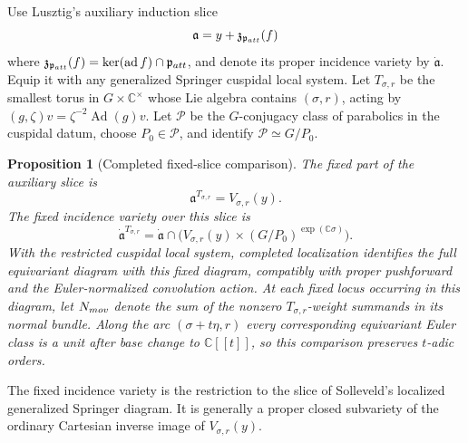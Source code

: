 \documentclass[10pt,a4paper]{amsart}
\newtheorem{proposition}[theorem]{Proposition}
\begin{document}
Use Lusztig's auxiliary induction slice
\[
 \mathfrak a=y+\mathfrak z_{\mathfrak p_{\rm att}}(f)
\]
where
$\mathfrak z_{\mathfrak p_{\rm att}}(f)=
\ker(\operatorname{ad}f)\cap\mathfrak p_{\rm att}$, and denote its proper
incidence variety by $\dot{\mathfrak a}$.  Equip it
with any generalized Springer cuspidal local system.  Let $T_{\sigma,r}$ be
the smallest torus in $G\times\mathbb C^\times$
whose Lie algebra contains $(\sigma,r)$, acting by
$(g,\zeta)v=\zeta^{-2}\operatorname{Ad}(g)v$.
Let $\mathcal P$ be the $G$-conjugacy class of parabolics in the cuspidal
datum, choose $P_0\in\mathcal P$, and identify $\mathcal P\simeq G/P_0$.

\begin{proposition}[Completed fixed-slice comparison]
\label{prop:general-fixed-slice}
The fixed part of the auxiliary slice is
\begin{equation}\label{eq:general-fixed-slice}
 \mathfrak a^{T_{\sigma,r}}=V_{\sigma,r}(y).
\end{equation}
The fixed incidence
variety over this slice is
\[
 \dot{\mathfrak a}^{T_{\sigma,r}}
 =\dot{\mathfrak a}\cap
 \bigl(V_{\sigma,r}(y)\times(G/P_0)^{\exp(\mathbb C\sigma)}\bigr).
\]
With the restricted cuspidal local system, completed localization identifies
the full equivariant diagram
with this fixed diagram, compatibly with proper pushforward and the
Euler-normalized convolution action.  At each fixed locus occurring in this diagram, let
$N_{\rm mov}$ denote the sum of the nonzero $T_{\sigma,r}$-weight summands in
its normal bundle.  Along the arc $(\sigma+t\eta,r)$ every corresponding
equivariant Euler class is a unit after base change to $\mathbb C[[t]]$, so
this comparison preserves $t$-adic orders.
\end{proposition}

The fixed incidence variety is the restriction to the slice of Solleveld's
localized generalized Springer diagram.  It is generally a proper closed
subvariety of the ordinary Cartesian inverse image of
$V_{\sigma,r}(y)$.
\end{document}
